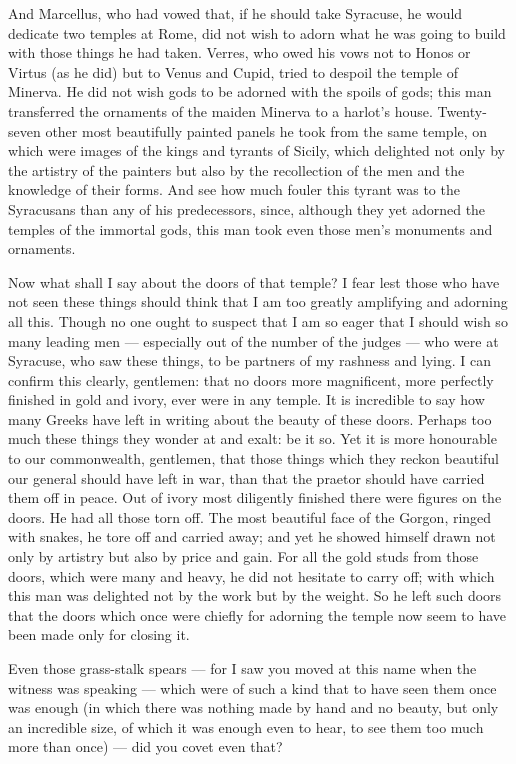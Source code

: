  And Marcellus, who had vowed that, if he should take Syracuse, he would dedicate two temples at Rome, did not wish to adorn what he was going to build with those things he had taken. Verres, who owed his vows not to Honos or Virtus (as he did) but to Venus and Cupid, tried to despoil the temple of Minerva. He did not wish gods to be adorned with the spoils of gods; this man transferred the ornaments of the maiden Minerva to a harlot's house. Twenty-seven other most beautifully painted panels he took from the same temple, on which were images of the kings and tyrants of Sicily, which delighted not only by the artistry of the painters but also by the recollection of the men and the knowledge of their forms. And see how much fouler this tyrant was to the Syracusans than any of his predecessors, since, although they yet adorned the temples of the immortal gods, this man took even those men's monuments and ornaments.

 Now what shall I say about the doors of that temple? I fear lest those who have not seen these things should think that I am too greatly amplifying and adorning all this. Though no one ought to suspect that I am so eager that I should wish so many leading men --- especially out of the number of the judges --- who were at Syracuse, who saw these things, to be partners of my rashness and lying. I can confirm this clearly, gentlemen: that no doors more magnificent, more perfectly finished in gold and ivory, ever were in any temple. It is incredible to say how many Greeks have left in writing about the beauty of these doors. Perhaps too much these things they wonder at and exalt: be it so. Yet it is more honourable to our commonwealth, gentlemen, that those things which they reckon beautiful our general should have left in war, than that the praetor should have carried them off in peace. Out of ivory most diligently finished there were figures on the doors. He had all those torn off. The most beautiful face of the Gorgon, ringed with snakes, he tore off and carried away; and yet he showed himself drawn not only by artistry but also by price and gain. For all the gold studs from those doors, which were many and heavy, he did not hesitate to carry off; with which this man was delighted not by the work but by the weight. So he left such doors that the doors which once were chiefly for adorning the temple now seem to have been made only for closing it.

 Even those grass-stalk spears --- for I saw you moved at this name when the witness was speaking --- which were of such a kind that to have seen them once was enough (in which there was nothing made by hand and no beauty, but only an incredible size, of which it was enough even to hear, to see them too much more than once) --- did you covet even that?

